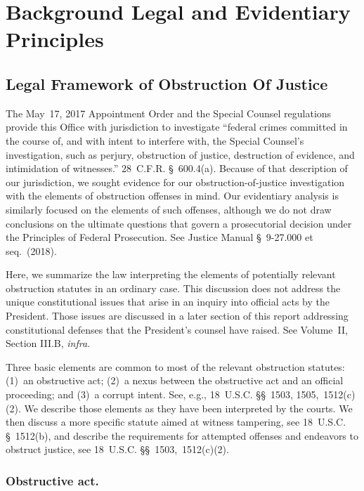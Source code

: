 \section{Background Legal and Evidentiary Principles}

\subsection{Legal Framework of Obstruction Of Justice}

The May~17, 2017 Appointment Order and the Special Counsel regulations provide this Office with jurisdiction to investigate ``federal crimes committed in the course of, and with intent to interfere with, the Special Counsel's investigation, such as perjury, obstruction of justice, destruction of evidence, and intimidation of witnesses.''
28~C.F.R. \S~600.4(a).
Because of that description of our jurisdiction, we sought evidence for our obstruction-of-justice investigation with the elements of obstruction offenses in mind.
Our evidentiary analysis is similarly focused on the elements of such offenses, although we do not draw conclusions on the ultimate questions that govern a prosecutorial decision under the Principles of Federal Prosecution.
See Justice Manual \S~9-27.000 et seq.~(2018).

Here, we summarize the law interpreting the elements of potentially relevant obstruction statutes in an ordinary case.
This discussion does not address the unique constitutional issues that arise in an inquiry into official acts by the President.
Those issues are discussed in a later section of this report addressing constitutional defenses that the President's counsel have raised. See Volume~II, Section III.B, \textit{infra}.

Three basic elements are common to most of the relevant obstruction statutes: (1)~an obstructive act; (2)~a nexus between the obstructive act and an official proceeding; and (3)~a corrupt intent.
See, e.g., 18~U.S.C. \S\S~1503, 1505,~1512(c)(2).
We describe those elements as they have been interpreted by the courts.
We then discuss a more specific statute aimed at witness tampering, see 18~U.S.C. \S~1512(b), and describe the requirements for attempted offenses and endeavors to obstruct justice, see 18~U.S.C. \S\S~1503,~1512(c)(2).

\subsubsection*{Obstructive act.}

